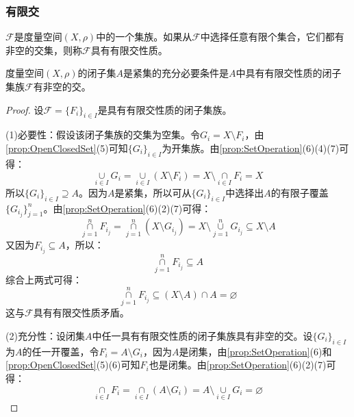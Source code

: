 \subsubsection{有限交}
\begin{definition}
	$\mathscr{F}$是度量空间$(X,\rho)$中的一个集族。如果从$\mathscr{F}$中选择任意有限个集合，它们都有非空的交集，则称$\mathscr{F}$具有有限交性质。
\end{definition}
\begin{theorem}
	度量空间$(X,\rho)$的闭子集$A$是紧集的充分必要条件是$A$中具有有限交性质的闭子集族$\mathscr{F}$有非空的交。
\end{theorem}
\begin{proof}
	设$\mathscr{F}=\{F_i\}_{i\in I}$是具有有限交性质的闭子集族。\par
	(1)必要性：假设该闭子集族的交集为空集。令$G_i=X\setminus F_i$，由\cref{prop:OpenClosedSet}(5)可知$\{G_i\}_{i\in I}$为开集族。由\cref{prop:SetOperation}(6)(4)(7)可得：
	\begin{equation*}
		\underset{i\in I}{\overset{}{\cup}}G_i=\underset{i\in I}{\overset{}{\cup}}(X\setminus F_i)=X\setminus \underset{i\in I}{\overset{}{\cap}}F_i=X
	\end{equation*}
	所以$\{G_i\}_{i\in I}\supseteq A$。因为$A$是紧集，所以可从$\{G_i\}_{i\in I}$中选择出$A$的有限子覆盖$\{G_{i_j}\}_{j=1}^n$。由\cref{prop:SetOperation}(6)(2)(7)可得：
	\begin{equation*}
		\underset{j=1}{\overset{n}{\cap}}F_{i_j}=\underset{j=1}{\overset{n}{\cap}}(X\setminus G_{i_j})=X\setminus\underset{j=1}{\overset{n}{\cup}}G_{i_j}\subseteq X\setminus A
	\end{equation*}
	又因为$F_{i_j}\subseteq A$，所以：
	\begin{equation*}
		\underset{j=1}{\overset{n}{\cap}}F_{i_j}\subseteq A
	\end{equation*}
	综合上两式可得：
	\begin{equation*}
		\underset{j=1}{\overset{n}{\cap}}F_{i_j}\subseteq(X\setminus A)\cap A=\varnothing
	\end{equation*}
	这与$\mathscr{F}$具有有限交性质矛盾。\par
	(2)充分性：设闭集$A$中任一具有有限交性质的闭子集族具有非空的交。设$\{G_i\}_{i\in I}$为$A$的任一开覆盖，令$F_i=A\setminus G_i$，因为$A$是闭集，由\cref{prop:SetOperation}(6)和\cref{prop:OpenClosedSet}(5)(6)可知$F_i$也是闭集。由\cref{prop:SetOperation}(6)(2)(7)可得：
	\begin{equation*}
		\underset{i\in I}{\overset{}{\cap}}F_i=\underset{i\in I}{\overset{}{\cap}}(A\setminus G_i)=A\setminus\underset{i\in I}{\overset{}{\cup}}G_i=\varnothing

\end{equation*}
\end{proof}
